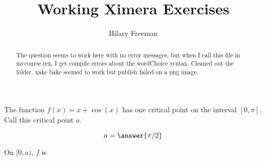 \documentclass[handout]{ximera}
\title{Working Ximera Exercises}
\author{Hilary Freeman}
\begin{document}
\begin{abstract}
  The question seems to work here with no error messages, but when I call this file in mycourse.tex, I get compile errors about the wordChoice syntax.  Cleaned out the folder. xake bake seemed to work but publish failed on a png image.
\end{abstract}
\maketitle



\begin{exercise}
The function $f(x) =x+\cos(x)$ has one critical point on the interval $[0,\pi]$. Call this critical point $a$.

$$
a = \answer{\pi/2}
$$

On $[0,a)$, $f$ is 



\end{exercise}
\end{document}

